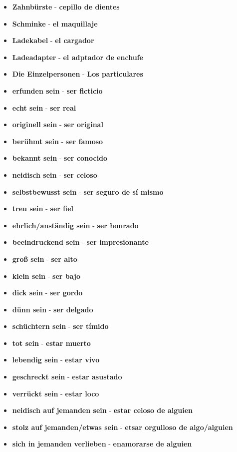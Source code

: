 \documentclass{article}
\begin{document}
\begin{multicols}{2}
\begin{itemize}
		\item{\textbf{Zahnbürste} - \textbf{cepillo de dientes}}
		\item{\textbf{Schminke} - \textbf{el maquillaje}}
		\item{\textbf{Ladekabel} - \textbf{el cargador}}
		\item{\textbf{Ladeadapter} - \textbf{el adptador de enchufe}}
		\item{\textbf{Die Einzelpersonen} - \textbf{Los particulares}}
		\item{\textbf{erfunden sein} - \textbf{ser ficticio}}
		\item{\textbf{echt sein} - \textbf{ser real}}
		\item{\textbf{originell sein} - \textbf{ser original}}
		\item{\textbf{berühmt sein} - \textbf{ser famoso}}
		\item{\textbf{bekannt sein} - \textbf{ser conocido}}
		\item{\textbf{neidisch sein} - \textbf{ser celoso}}
		\item{\textbf{selbstbewusst sein} - \textbf{ser seguro de sí mismo}}
		\item{\textbf{treu sein} - \textbf{ser fiel}}
		\item{\textbf{ehrlich/anständig sein} - \textbf{ser honrado}}
		\item{\textbf{beeindruckend sein} - \textbf{ser impresionante}}
		\item{\textbf{groß sein} - \textbf{ser alto}}
		\item{\textbf{klein sein} - \textbf{ser bajo}}
		\item{\textbf{dick sein} - \textbf{ser gordo}}
		\item{\textbf{dünn sein} - \textbf{ser delgado}}
		\item{\textbf{schüchtern sein} - \textbf{ser tímido}}
		\item{\textbf{tot sein} - \textbf{estar muerto}}
		\item{\textbf{lebendig sein} - \textbf{estar vivo}}
		\item{\textbf{geschreckt sein} - \textbf{estar asustado}}
		\item{\textbf{verrückt sein} - \textbf{estar loco}}
		\item{\textbf{neidisch auf jemanden sein} - \textbf{estar celoso de alguien}}
		\item{\textbf{stolz auf jemanden/etwas sein} - \textbf{etsar orgulloso de algo/alguien}}
		\item{\textbf{sich in jemanden verlieben} - \textbf{enamorarse de alguien}}

\end{itemize}
\end{multicols}
\end{document}
